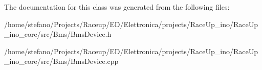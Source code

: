 The documentation for this class was generated from the following files\+:\begin{DoxyCompactItemize}
\item 
/home/stefano/\+Projects/\+Raceup/\+E\+D/\+Elettronica/projects/\+Race\+Up\+\_\+ino/\+Race\+Up\+\_\+ino\+\_\+core/src/\+Bms/Bms\+Device.\+h\item 
/home/stefano/\+Projects/\+Raceup/\+E\+D/\+Elettronica/projects/\+Race\+Up\+\_\+ino/\+Race\+Up\+\_\+ino\+\_\+core/src/\+Bms/Bms\+Device.\+cpp\end{DoxyCompactItemize}
